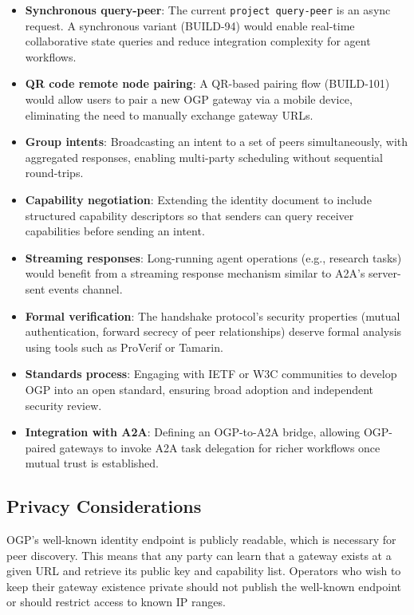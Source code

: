 \documentclass[conference]{IEEEtran}
\begin{document}
\begin{itemize}
  \item \textbf{Synchronous query-peer}: The current \texttt{project query-peer} is an async request. A synchronous variant (BUILD-94) would enable real-time collaborative state queries and reduce integration complexity for agent workflows.
  \item \textbf{QR code remote node pairing}: A QR-based pairing flow (BUILD-101) would allow users to pair a new OGP gateway via a mobile device, eliminating the need to manually exchange gateway URLs.
  \item \textbf{Group intents}: Broadcasting an intent to a set of peers simultaneously, with aggregated responses, enabling multi-party scheduling without sequential round-trips.
  \item \textbf{Capability negotiation}: Extending the identity document to include structured capability descriptors so that senders can query receiver capabilities before sending an intent.
  \item \textbf{Streaming responses}: Long-running agent operations (e.g., research tasks) would benefit from a streaming response mechanism similar to A2A's server-sent events channel.
  \item \textbf{Formal verification}: The handshake protocol's security properties (mutual authentication, forward secrecy of peer relationships) deserve formal analysis using tools such as ProVerif or Tamarin.
  \item \textbf{Standards process}: Engaging with IETF or W3C communities to develop OGP into an open standard, ensuring broad adoption and independent security review.
  \item \textbf{Integration with A2A}: Defining an OGP-to-A2A bridge, allowing OGP-paired gateways to invoke A2A task delegation for richer workflows once mutual trust is established.
\end{itemize}

\subsection{Privacy Considerations}

OGP's well-known identity endpoint is publicly readable, which is necessary for peer discovery. This means that any party can learn that a gateway exists at a given URL and retrieve its public key and capability list. Operators who wish to keep their gateway existence private should not publish the well-known endpoint or should restrict access to known IP ranges.
\end{document}
